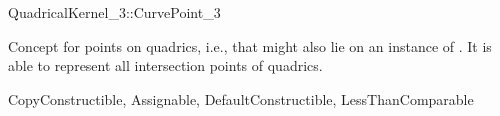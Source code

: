 \begin{ccRefConcept}{QuadricalKernel_3::CurvePoint_3}

\ccDefinition

Concept for points on quadrics, i.e., that might also lie
on an instance of . It is able to represent all 
intersection points of quadrics.

\ccRefines
CopyConstructible, Assignable, DefaultConstructible, LessThanComparable


\end{ccRefConcept}

